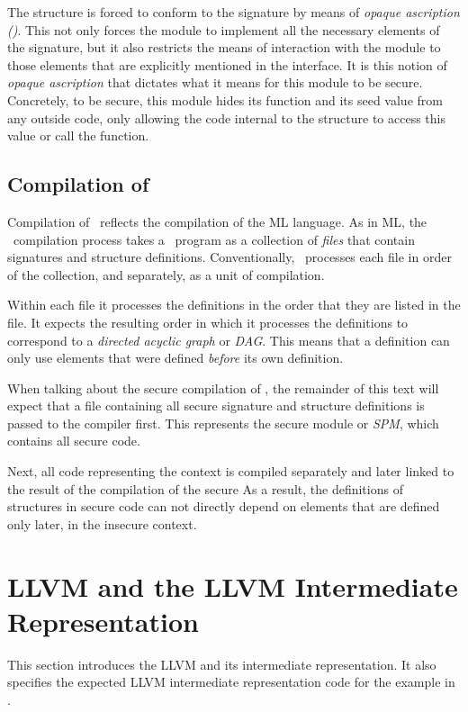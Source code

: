 The  structure is forced to conform to the signature  by means of \emph{opaque ascription (\lsttext{:>})}.
This not only forces the module to implement all the necessary elements of the signature, but it also restricts the means of interaction with the module to those elements that are explicitly mentioned in the interface.
It is this notion of \emph{opaque ascription} that dictates what it means for this module to be secure.
Concretely, to be secure, this module hides its  function and its seed value from any outside code, only allowing the code internal to the structure to access this value or call the function.

\subsection{Compilation of \MiniML}
\label{sec:DefinitionOfCompilation}
Compilation of \MiniML\ reflects the compilation of the ML language.
As in ML, the \MiniML\ compilation process takes a \MiniML\ program as a collection of \emph{files} that contain signatures and structure definitions.
Conventionally, \MiniML\ processes each file in order of the collection, and separately, as a unit of compilation.

Within each file it processes the definitions in the order that they are listed in the file. It expects the resulting order in which it processes the definitions to correspond to a \emph{directed acyclic graph} or \emph{DAG}.
This means that a definition can only use elements that were defined \emph{before} its own definition.

When talking about the secure compilation of \MiniML, the remainder of this text will expect that a file containing all secure signature and structure definitions is passed to the compiler first.
This represents the secure module or \emph{SPM}, which contains all secure code.

Next, all code representing the context is compiled separately and later linked to the result of the compilation of the secure
As a result, the definitions of structures in secure code can not directly depend on elements that are defined only later, in the insecure context.


\section{LLVM and the LLVM Intermediate Representation}
\label{sec:LLVM}
This section introduces the LLVM and its intermediate representation.
It also specifies the expected LLVM intermediate representation code for the example in .

